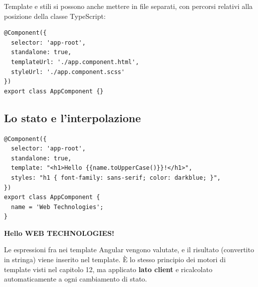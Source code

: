 Template e stili si possono anche mettere in file separati, con percorsi
relativi alla posizione della classe TypeScript:

\begin{affianco}[0.46][c]
\begin{lstlisting}[style=ts, name=app.component.ts]
@Component({
  selector: 'app-root',
  standalone: true,
  templateUrl: './app.component.html',
  styleUrl: './app.component.scss'
})
export class AppComponent {}
\end{lstlisting}
\risultato
\begin{immagine}
\end{immagine}
\end{affianco}

\subsection{Lo stato e l'interpolazione}

\begin{affianco}[0.5][c]
\codicepiccolo
\begin{lstlisting}[style=ts, name=app.component.ts]
@Component({
  selector: 'app-root',
  standalone: true,
  template: "<h1>Hello {{name.toUpperCase()}}!</h1>",
  styles: "h1 { font-family: sans-serif; color: darkblue; }",
})
export class AppComponent {
  name = 'Web Technologies';
}
\end{lstlisting}
\risultato
\begin{browser}[AngularApp]
  {\Lato\bfseries\LARGE\color{css-darkblue} Hello WEB TECHNOLOGIES!\par}
\end{browser}
\end{affianco}

Le espressioni fra \code{\{\{ \}\}} nei template Angular vengono valutate, e il
risultato (convertito in stringa) viene inserito nel template. È lo stesso
principio dei motori di template visti nel capitolo 12, ma applicato
\textbf{lato client} e ricalcolato automaticamente a ogni cambiamento di stato.

